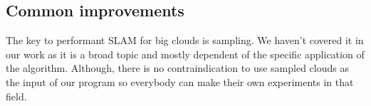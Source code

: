 \documentclass[titlepage]{article}
\begin{document}
\subsection{Common improvements}
The key to performant SLAM for big clouds is sampling. We haven't covered it in our work as it is a broad topic and mostly dependent of the specific application of the algorithm. Although, there is no contraindication to use sampled clouds as the input of our program so everybody can make their own experiments in that field.

\newpage
\printbibliography
\end{document}
